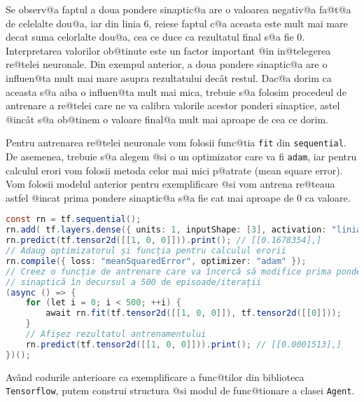 Se observ@a faptul a doua pondere sinaptic@a are o valoarea negativ@a fa@t@a de celelalte dou@a, iar din linia 6, reiese faptul c@a aceasta este mult mai mare decat suma celorlalte dou@a, cea ce duce ca rezultatul final s@a fie 0. Interpretarea valorilor ob@tinute este un factor important @in in@telegerea re@telei neuronale. Din exempul anterior, a doua pondere sinaptic@a are o influen@ta mult mai mare asupra rezultatului dec\^ at restul. Dac@a dorim ca aceasta s@a aiba o influen@ta mult mai mica, trebuie s@a folosim procedeul de antrenare a re@telei care ne va calibra valorile acestor ponderi sinaptice, astel @inc\^ at s@a ob@tinem o valoare final@a mult mai aproape de cea ce dorim.

Pentru antrenarea re@telei neuronale vom folosii func@tia \texttt{fit} din \texttt{sequential}. De asemenea, trebuie s@a alegem @si o un optimizator care va fi \texttt{adam}, iar pentru calculul erori vom folosii metoda celor mai mici p@atrate (mean square error). Vom folosii modelul anterior pentru exemplificare @si vom antrena re@teaua astfel @incat prima pondere sinaptic@a s@a fie cat mai aproape de 0 ca valoare.

\begin{lstlisting}[language=Java, caption={Exemplu de antrenare a unei simple rețele neuronale cu funcție de activare}]
const rn = tf.sequential();
rn.add( tf.layers.dense({ units: 1, inputShape: [3], activation: "liniar", useBias: false }) );
rn.predict(tf.tensor2d([[1, 0, 0]])).print(); // [[0.1678354],] 
// Adaug optimizatorul și funcția pentru calculul erorii
rn.compile({ loss: "meanSquaredError", optimizer: "adam" });
// Creez o funcție de antrenare care va încercă să modifice prima pondere 
// sinaptică în decursul a 500 de episoade/iterații
(async () => {
	for (let i = 0; i < 500; ++i) {
		await rn.fit(tf.tensor2d([[1, 0, 0]]), tf.tensor2d([[0]]));
	}
	// Afișez rezultatul antrenamentului
	rn.predict(tf.tensor2d([[1, 0, 0]])).print(); // [[0.0001513],]
})();
\end{lstlisting}

Av\^ and codurile anterioare ca exemplificare a func@tilor din biblioteca \texttt{Tensorflow}, putem construi structura @si modul de func@tionare a clasei \texttt{Agent}.

